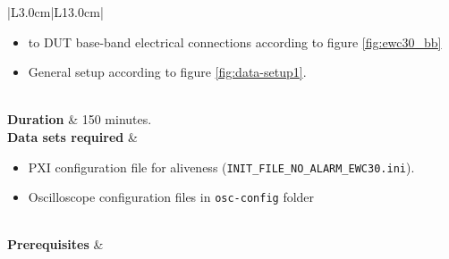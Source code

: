 \begin{table}[H]
\begin{tabular}{|L{3.0cm}|L{13.0cm}|}
\begin{minipage}[t]{\linewidth}
\begin{itemize}[nosep,after=\strut]
		\item \comEgse{}{} to DUT base-band electrical connections according to figure \ref{fig:ewc30_bb} 
		\item General setup according to figure \ref{fig:data-setup1}.
		\end{itemize}
	\end{minipage}
		\\ \hline
		\textbf{Duration} & 150 minutes.	\\\hline		
		\textbf{Data sets required} &  
		\begin{minipage}[t]{\linewidth}
			\begin{itemize}[nosep,after=\strut]
				\item \comEgse{}{} PXI configuration file for aliveness (\texttt{INIT\_FILE\_NO\_ALARM\_EWC30.ini}).
				\item Oscilloscope configuration files in \texttt{osc-config} folder
				\end{itemize}
			\end{minipage}\\
		\hline
		\textbf{Prerequisites} & 
		\begin{minipage}[t]{\linewidth}
			\begin{itemize}[nosep,after=\strut]

\end{itemize}
\end{minipage}
\end{tabular}
\end{table}
